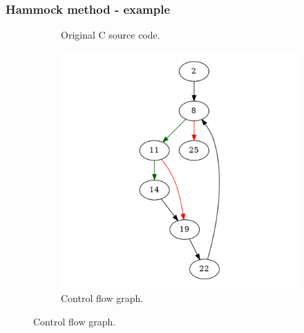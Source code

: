 \documentclass[aspectratio=1610]{beamer}
\begin{document}
\begin{frame}
	\frametitle{Hammock method - example}
	\begin{figure}[htbp]
		\centering
		\begin{subfigure}[b]{0.30\textwidth}
			\centering
			
			\caption{Original C source code.}
		\end{subfigure}
		\begin{subfigure}[b]{0.50\textwidth}
			\centering
			\includegraphics[height=0.6\paperheight]{inc/methods/hammock/example/without-break/main.png}
			\caption{Control flow graph.}
		\end{subfigure}
	\end{figure}
\end{frame}
\end{document}
